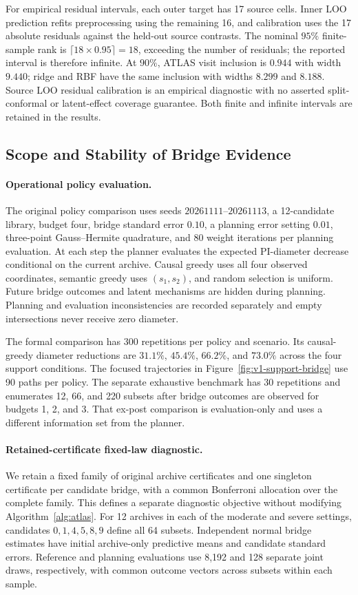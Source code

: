 For empirical residual intervals, each outer target has 17 source cells. Inner LOO prediction refits preprocessing using the remaining 16, and calibration uses the 17 absolute residuals against the held-out source contrasts. The nominal $95\%$ finite-sample rank is $\lceil18\times0.95\rceil=18$, exceeding the number of residuals; the reported interval is therefore infinite. At $90\%$, ATLAS visit inclusion is $0.944$ with width $9.440$; ridge and RBF have the same inclusion with widths $8.299$ and $8.188$. Source LOO residual calibration is an empirical diagnostic with no asserted split-conformal or latent-effect coverage guarantee. Both finite and infinite intervals are retained in the results.

\subsection{Scope and Stability of Bridge Evidence}
\label{app:bridge-design}

\paragraph{Operational policy evaluation.}
The original policy comparison uses seeds $20261111$--$20261113$, a 12-candidate library, budget four, bridge standard error $0.10$, a planning error setting $0.01$, three-point Gauss--Hermite quadrature, and 80 weight iterations per planning evaluation. At each step the planner evaluates the expected PI-diameter decrease conditional on the current archive. Causal greedy uses all four observed coordinates, semantic greedy uses $(s_1,s_2)$, and random selection is uniform. Future bridge outcomes and latent mechanisms are hidden during planning. Planning and evaluation inconsistencies are recorded separately and empty intersections never receive zero diameter.

The formal comparison has 300 repetitions per policy and scenario. Its causal-greedy diameter reductions are $31.1\%$, $45.4\%$, $66.2\%$, and $73.0\%$ across the four support conditions. The focused trajectories in Figure~\ref{fig:v1-support-bridge} use 90 paths per policy. The separate exhaustive benchmark has 30 repetitions and enumerates 12, 66, and 220 subsets after bridge outcomes are observed for budgets 1, 2, and 3. That ex-post comparison is evaluation-only and uses a different information set from the planner.

\paragraph{Retained-certificate fixed-law diagnostic.}
We retain a fixed family of original archive certificates and one singleton certificate per candidate bridge, with a common Bonferroni allocation over the complete family. This defines a separate diagnostic objective without modifying Algorithm~\ref{alg:atlas}. For 12 archives in each of the moderate and severe settings, candidates $0,1,4,5,8,9$ define all 64 subsets. Independent normal bridge estimates have initial archive-only predictive means and candidate standard errors. Reference and planning evaluations use 8,192 and 128 separate joint draws, respectively, with common outcome vectors across subsets within each sample.

